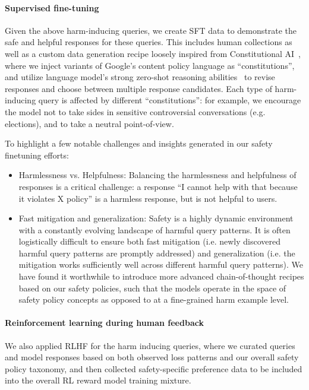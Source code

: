 \paragraph{Supervised fine-tuning}

Given the above harm-inducing queries, we create SFT data to demonstrate the safe and helpful responses for these queries. This includes human collections as well as a custom data generation recipe loosely inspired from Constitutional AI~\cite{bai2022constitutional}, where we inject variants of Google’s content policy language as “constitutions”, and utilize language model’s strong zero-shot reasoning abilities~\cite{kojima2022large} to revise responses and choose between multiple response candidates. Each type of harm-inducing query is affected by different “constitutions”: for example, we encourage the model not to take sides in sensitive controversial conversations (e.g. elections), and to take a neutral point-of-view.

To highlight a few notable challenges and insights generated in our safety finetuning efforts:
\begin{itemize}
\item Harmlessness vs. Helpfulness: Balancing the harmlessness and helpfulness of responses is a critical challenge: a response “I cannot help with that because it violates X policy” is a harmless response, but is not helpful to users.
\item Fast mitigation and generalization: Safety is a highly dynamic environment with a constantly evolving landscape of harmful query patterns. It is often logistically difficult to ensure both fast mitigation (i.e. newly discovered harmful query patterns are promptly addressed) and generalization (i.e. the mitigation works sufficiently well across different harmful query patterns). We have found it worthwhile to introduce more advanced chain-of-thought recipes based on our safety policies, such that the models operate in the space of safety policy concepts as opposed to at a fine-grained harm example level.
\end{itemize}

\paragraph{Reinforcement learning during human feedback}

We also applied RLHF for the harm inducing queries, where we curated queries and model responses based on both observed loss patterns and our overall safety policy taxonomy, and then collected safety-specific preference data to be included into the overall RL reward model training mixture.

